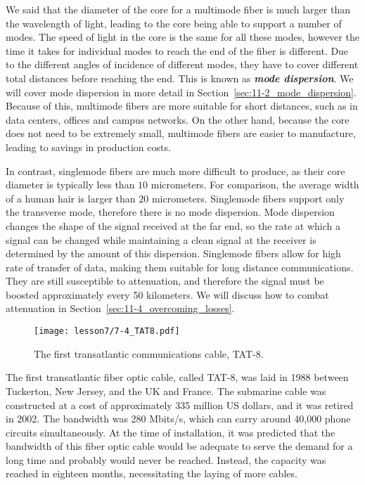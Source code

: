 We said that the diameter of the core for a multimode fiber is much larger than the wavelength of light, leading to the core being able to support a number of modes.
The speed of light in the core is the same for all these modes, however the time it takes for individual modes to reach the end of the fiber is different.
Due to the different angles of incidence of different modes, they have to cover different total distances before reaching the end.
This is known as \textbf{\emph{mode dispersion}}.
We will cover mode dispersion in more detail in Section~\ref{sec:11-2_mode_dispersion}.
Because of this, multimode fibers are more suitable for short distances, such as in data centers, offices and campus networks.
On the other hand, because the core does not need to be extremely small, multimode fibers are easier to manufacture, leading to savings in production costs.

In contrast, singlemode fibers are much more difficult to produce, as their core diameter is typically less than $10$ micrometers.
For comparison, the average width of a human hair is larger than $20$ micrometers.
Singlemode fibers support only the transverse mode, therefore there is no mode dispersion.
Mode dispersion changes the shape of the signal received at the far end, so the rate at which a signal can be changed while maintaining a clean signal at the receiver is determined by the amount of this dispersion.
Singlemode fibers allow for high rate of transfer of data, making them suitable for long distance communications.
They are still susceptible to attenuation, and therefore the signal must be boosted approximately every 50 kilometers.
We will discuss how to combat attenuation in Section~\ref{sec:11-4_overcoming_losses}.

\begin{figure}[t]
    \centering
    \texttt{[image: lesson7/7-4\_TAT8.pdf]}
    \caption[TAT-8]{The first transatlantic communications cable, TAT-8.}
    \label{fig:7-4_TAT8}
\end{figure}

The first transatlantic fiber optic cable, called TAT-8, was laid in 1988 between Tuckerton, New Jersey, and the UK and France.
The submarine cable was constructed at a cost of approximately 335 million US dollars, and it was retired in 2002.
The bandwidth was 280 Mbits/s, which can carry around 40,000 phone circuits simultaneously. At the time of installation, it was predicted that the bandwidth of this fiber optic cable would be adequate to serve the demand for a long time and probably would never be reached.
Instead, the capacity was reached in eighteen months, necessitating the laying of more cables.

